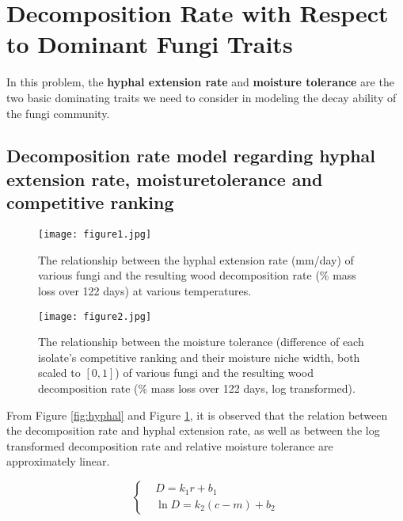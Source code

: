 \section{Decomposition Rate with Respect to Dominant Fungi Traits}\label{sec:rate}

In this problem, the \textbf{hyphal extension rate} and \textbf{moisture tolerance} are the two basic dominating traits we need to consider in modeling the decay ability of the fungi community.

\subsection{Decomposition  rate model regarding  hyphal  extension  rate,  moisturetolerance and competitive ranking}


\begin{figure}
    \centering
    \begin{minipage}[t]{0.48\textwidth}
        \centering
        \texttt{[image: figure1.jpg]}
        \caption{The relationship between the hyphal extension rate (mm/day) of various fungi and the resulting wood decomposition rate (\% mass loss over 122 days) at various temperatures.}\label{fig:hyphal}
    \end{minipage}
    \begin{minipage}[t]{0.48\textwidth}
        \centering
        \texttt{[image: figure2.jpg]}
        \caption{The relationship between the moisture tolerance (difference of each isolate’s competitive ranking and their moisture niche width, both scaled to $[0,1]$) of various fungi and the resulting wood decomposition rate (\% mass loss over 122 days, log transformed).}\label{fig:moisture}
    \end{minipage}
\end{figure}
    

From Figure \ref{fig:hyphal} and Figure \ref{fig:moisture}, it is observed that the relation between the decomposition rate and hyphal extension rate, as well as between the log transformed decomposition rate and relative moisture tolerance are approximately linear.

\begin{equation}
    \left\{\begin{aligned} &
        D = k_1r + b_1 \\ &
        \ln D = k_2(c - m) + b_2
    \end{aligned}\right.
\end{equation}

